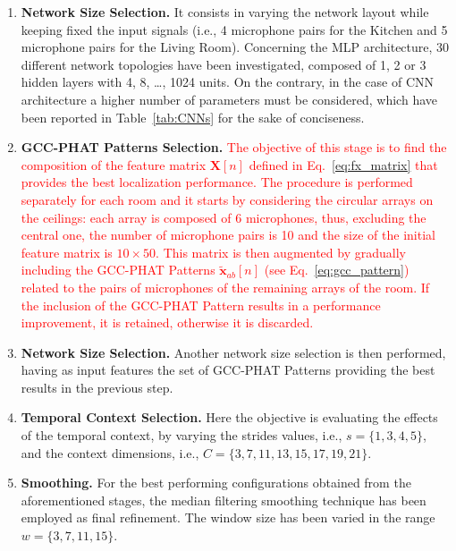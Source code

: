\documentclass[review]{elsarticle}
\newcommand{\tableref}[1]{Table~\ref{#1}}
\let\originaleqref=\eqref
\renewcommand{\eqref}{Eq.~\originaleqref}
\begin{document}
\begin{enumerate}
	\item{\textbf{Network Size Selection.}}  It consists in varying the network layout while keeping fixed the input signals (i.e., 4 microphone pairs for the Kitchen and 5 microphone pairs for the Living Room). 
	Concerning the MLP architecture, 30 different network topologies have been investigated, composed of 1, 2 or 3 hidden layers with 4, 8, \dots, 1024 units. 
	On the contrary, in the case of CNN architecture a higher number of parameters must be considered, which have been reported in \tableref{tab:CNNs} for the sake of conciseness. 
	\item{\textbf{GCC-PHAT Patterns Selection.}} \textcolor{red}{The objective of this stage is to find the composition of the feature matrix $\mathbf{X}[n]$ defined in \eqref{eq:fx_matrix} that provides the best localization performance. The procedure is performed separately for each room and it starts by considering the circular arrays on the ceilings: each array is composed of 6 microphones, thus, excluding the central one, the number of microphone pairs is 10 and the size of the initial feature matrix is $10 \times 50$. This matrix is then augmented by gradually including the GCC-PHAT Patterns $\mathbf{\tilde{x}}_{ab}[n]$ (see \eqref{eq:gcc_pattern}) related to the pairs of microphones of the remaining arrays of the room. If the inclusion of the GCC-PHAT Pattern results in a performance improvement, it is retained, otherwise it is discarded.}
	
	\item{\textbf{Network Size Selection.}} Another network size selection is then performed, having as input features the set of GCC-PHAT Patterns providing the best results in the previous step. 
	\item{\textbf{Temporal Context Selection.}} Here the objective is evaluating the effects of the temporal context, by varying the strides values, i.e., $s=\{1,3,4,5\}$, and the context dimensions, i.e., $C=\{3,7,11,13,15,17,19,21\}$.
	\item{\textbf{Smoothing.}} For the best performing configurations obtained from the aforementioned stages, the median filtering smoothing technique has been employed as final refinement. The window size has been varied in the range $w=\{3,7,11,15\}$.
\end{enumerate}
\end{document}
